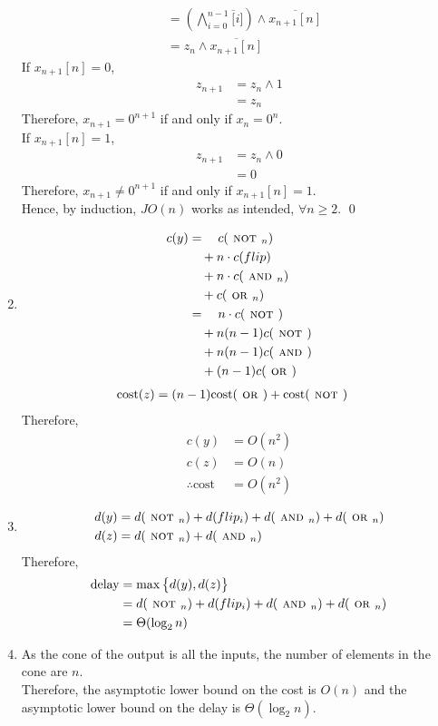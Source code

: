 \documentclass[fleqn, a4paper, 11pt, oneside]{amsart}
\theoremstyle{definition}
\theoremstyle{theorem}
\theoremstyle{remark}
\newcommand{\Not}{{\textsc{ not }}}
\renewcommand{\And}{{\textsc{ and }}}
\newcommand{\Or}{{\textsc{ or }}}
\newcommand{\AND}{\wedge}
\newcommand{\bigAND}{\bigwedge}
\begin{document}
\begin{solution}
\begin{enumerate}[leftmargin = *]
\begin{align*}
				&= \left( \bigAND_{i = 0}^{n - 1} \overline[i] \right) \AND \overline{x_{n + 1}[n]}\\
				&= z_n \AND \overline{x_{n + 1}[n]}
			\end{align*}
			If $x_{n + 1}[n] = 0$,
			\begin{align*}
				z_{n + 1} &= z_n \AND 1\\
				&= z_n
			\end{align*}
			Therefore, $x_{n + 1} = 0^{n + 1}$ if and only if $x_n = 0^n$.\\
			If $x_{n + 1}[n] = 1$,
			\begin{align*}
				z_{n + 1} &= z_n \AND 0\\
				&= 0
			\end{align*}
			Therefore, $x_{n + 1} \neq 0^{n + 1}$ if and only if $x_{n + 1}[n] = 1$.\\
			Hence, by induction, $JO(n)$ works as intended, $\forall n \ge 2$.
			\qed
		\item
			\begin{align*}
				c(y) &= \quad c(\Not_n)\\
				&\quad + n \cdot c(flip)\\
				&\quad + n \cdot c(\And_n)\\
				&\quad + c(\Or_n)\\
				&=\quad n \cdot c(\Not)\\
				&\quad + n (n - 1) c(\Not)\\
				&\quad + n (n - 1) c(\And)\\
				&\quad + (n - 1) c(\Or)
			\end{align*}
			\begin{align*}
				\text{cost}(z) &= (n - 1) \text{cost}(\Or) + \text{cost}(\Not)
			\end{align*}
			Therefore,
			\begin{align*}
				c(y) &= O\left( n^2 \right)\\
				c(z) &= O (n)\\
				\therefore \text{cost} &= O\left( n^2 \right)
			\end{align*}
		\item
			\begin{align*}
				d(y) &= d(\Not_n) + d(flip_i) + d(\And_n) + d(\Or_n)\\
				d(z) &= d(\Not_n) + d(\And_n)
			\end{align*}
			Therefore,
			\begin{align*}
				\text{delay} &= \max\left\{ d(y) , d(z) \right\}\\
				&= d(\Not_n) + d(flip_i) + d(\And_n) + d(\Or_n)\\
				&= \Theta(\log_2 n)
			\end{align*}
		\item
			As the cone of the output is all the inputs, the number of elements in the cone are $n$.\\
			Therefore, the asymptotic lower bound on the cost is $O(n)$ and the asymptotic lower bound on the delay is $\Theta(\log_2 n)$.
	\end{enumerate}
\end{solution}
\end{document}
